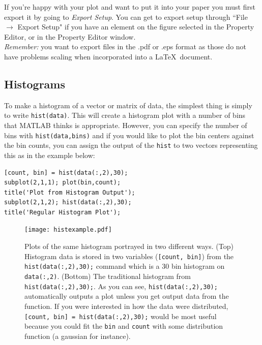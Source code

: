 If you're happy with your plot and want to put it into your paper you must first export it by going to \emph{Export Setup}. You can get to export setup through ``File $\to$ Export Setup" if you have an element on the figure selected in the Property Editor, or in the Property Editor window.\\

\emph{Remember:} you want to export files in the .pdf or .eps format as those do not have problems scaling when incorporated into a \LaTeX\ document.

\subsection{Histograms}

To make a histogram of a vector or matrix of data, the simplest thing is simply to write \texttt{hist(data)}. This will create a histogram plot with a number of bins that MATLAB thinks is appropriate. However, you can specify the number of bins with \texttt{hist(data,bins)} and if you would like to plot the bin centers against the bin counts, you can assign the output of the \texttt{hist} to two vectors representing this as in the example below:

\begin{framed}
\begin{verbatim}
[count, bin] = hist(data(:,2),30);
subplot(2,1,1); plot(bin,count);
title('Plot from Histogram Output');
subplot(2,1,2); hist(data(:,2),30);
title('Regular Histogram Plot');
\end{verbatim}
\end{framed}

\begin{figure}[h]
\centering
\texttt{[image: histexample.pdf]}
\caption{{Plots of the same histogram portrayed in two different ways. (Top) Histogram data is stored in two variables (\texttt{[count, bin]}) from the  \texttt{hist(data(:,2),30);} command which is a 30 bin histogram on \texttt{data(:,2)}. (Bottom) The traditional histogram from \texttt{hist(data(:,2),30);}. As you can see, \texttt{hist(data(:,2),30);} automatically outputs a plot unless you get output data from the function. If you were interested in how the data were distributed,\texttt{ [count, bin] = hist(data(:,2),30);} would be most useful because you could fit the \texttt{bin} and \texttt{count} with some distribution function (a gaussian for instance).}}
\label{histoplot}
\end{figure}
